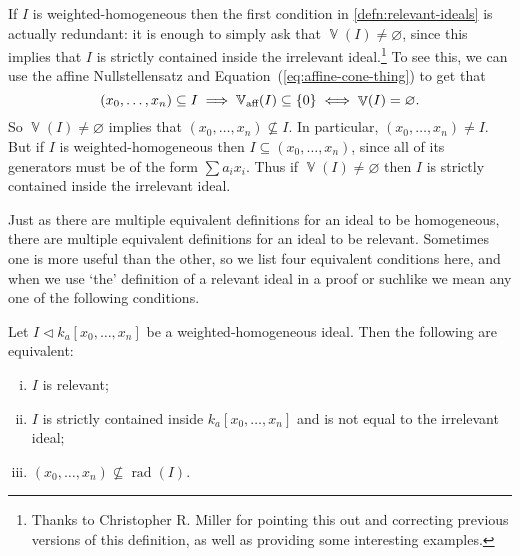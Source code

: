\documentclass[10pt,notitlepage]{article}
\numberwithin{equation}{subsection}
\DeclareMathOperator{\van}{\mathbb{V}}
\DeclareMathOperator{\rad}{rad}
\DeclareMathOperator{\vanaff}{\mathbb{V}_{\textnormal{aff}}}
\newcommand{\kazn}{k_a[x_0,\ldots,x_n]}
\begin{document}
    \begin{note}
        If $I$ is weighted-homogeneous then the first condition in \cref{defn:relevant-ideals} is actually redundant: it is enough to simply ask that $\van(I)\neq\varnothing$, since this implies that $I$ is strictly contained inside the irrelevant ideal.\footnote{Thanks to Christopher R. Miller for pointing this out and correcting previous versions of this definition, as well as providing some interesting examples.}
        To see this, we can use the affine Nullstellensatz and Equation~(\ref{eq:affine-cone-thing}) to get that
        \begin{equation*}
            (x_0,\ldots,x_n)\subseteq I \implies \vanaff(I)\subseteq\{0\} \iff \van(I)=\varnothing.
        \end{equation*}
        So $\van(I)\neq\varnothing$ implies that $(x_0,\ldots,x_n)\not\subseteq I$.
        In particular, $(x_0,\ldots,x_n)\neq I$.
        But if $I$ is weighted-homogeneous then $I\subseteq(x_0,\ldots,x_n)$, since all of its generators must be of the form $\sum a_ix_i$.
        Thus if $\van(I)\neq\varnothing$ then $I$ is strictly contained inside the irrelevant ideal.
    \end{note}
    
    Just as there are multiple equivalent definitions for an ideal to be homogeneous, there are multiple equivalent definitions for an ideal to be relevant.
    Sometimes one is more useful than the other, so we list four equivalent conditions here, and when we use `the' definition of a relevant ideal in a proof or suchlike we mean any one of the following conditions.

    \begin{lemma}\label{lem:relevant-other-defs}
        Let $I\triangleleft\kazn$ be a weighted-homogeneous ideal.
        Then the following are equivalent:
        \begin{enumerate}[(i)]
            \item $I$ is relevant;
            \item $I$ is strictly contained inside $\kazn$ and is not equal to the irrelevant ideal;
            \item $(x_0,\ldots,x_n)\not\subseteq\rad(I)$.\qedhere
        \end{enumerate}
    \end{lemma}
\end{document}
